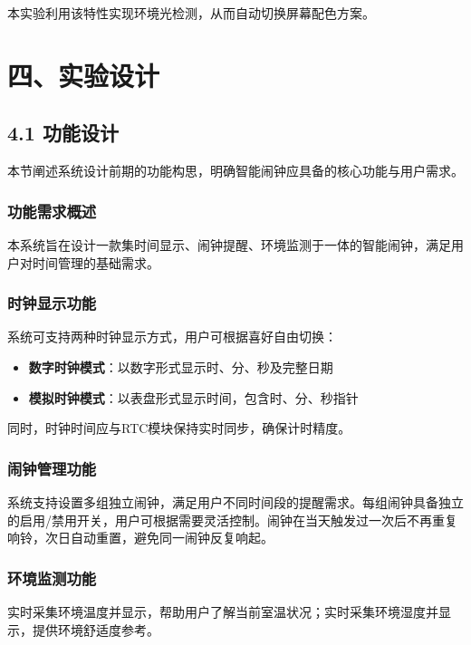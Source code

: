 \documentclass[12pt,a4paper]{article}
\begin{document}
本实验利用该特性实现环境光检测，从而自动切换屏幕配色方案。


\section*{四、实验设计}


\subsection*{4.1 功能设计}

本节阐述系统设计前期的功能构思，明确智能闹钟应具备的核心功能与用户需求。

\subsubsection*{功能需求概述}

本系统旨在设计一款集时间显示、闹钟提醒、环境监测于一体的智能闹钟，满足用户对时间管理的基础需求。

\subsubsection*{时钟显示功能}

系统可支持两种时钟显示方式，用户可根据喜好自由切换：
\begin{itemize}
    \item \textbf{数字时钟模式}：以数字形式显示时、分、秒及完整日期
    \item \textbf{模拟时钟模式}：以表盘形式显示时间，包含时、分、秒指针
\end{itemize}

同时，时钟时间应与RTC模块保持实时同步，确保计时精度。

\subsubsection*{闹钟管理功能}

系统支持设置多组独立闹钟，满足用户不同时间段的提醒需求。每组闹钟具备独立的启用/禁用开关，用户可根据需要灵活控制。闹钟在当天触发过一次后不再重复响铃，次日自动重置，避免同一闹钟反复响起。

\subsubsection*{环境监测功能}

实时采集环境温度并显示，帮助用户了解当前室温状况；实时采集环境湿度并显示，提供环境舒适度参考。
\end{document}
